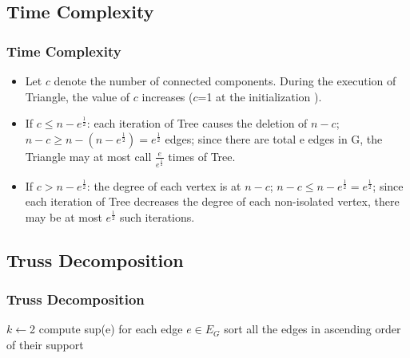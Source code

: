 \documentclass{beamer}
\begin{document}

\subsection{Time Complexity}
\begin{frame}
\frametitle{Time Complexity}
\begin{itemize}
\item Let $c$ denote the number of connected components. During the execution of Triangle, the value of $c$ increases ($c$=1 at the initialization ).
\item If $c\le n- e^{\frac{1}{2}}$: each iteration of Tree causes the deletion of $n-c$; $n-c \ge n-(n- e^{\frac{1}{2}})= e^{\frac{1}{2}}$ edges; since there are total e edges in G, the Triangle may at most call $\frac{e}{e^{\frac{1}{2}}}$ times of Tree.

\item If $c> n- e^{\frac{1}{2}}$: the degree of each vertex is at $n-c$; $n-c\le n- e^{\frac{1}{2}}=e^{\frac{1}{2}}$; since each iteration of Tree decreases the degree of each non-isolated vertex, there may be at most $e^{\frac{1}{2}}$ such iterations.
\end{itemize}
\end{frame}


\subsection{Truss Decomposition}
\begin{frame}
\frametitle{Truss Decomposition}
\begin{algorithm}[H]
	$k\leftarrow$2\;
	compute sup(e) for each edge $e\in E_{G}$\;
	sort all the edges in ascending order of their support\;
	
	
\end{algorithm}
\end{frame}
\end{document}
